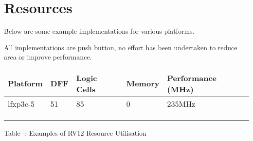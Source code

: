 \section{Resources}\label{resources}

Below are some example implementations for various platforms.

All implementations are push button, no effort has been undertaken to
reduce area or improve performance.

\begin{longtable}[]{@{}lllll@{}}
\toprule
Platform & DFF & Logic Cells & Memory & Performance (MHz)\tabularnewline
\midrule
\endhead
lfxp3c-5 & 51 & 85 & 0 & 235MHz\tabularnewline
& & & &\tabularnewline
& & & &\tabularnewline
& & & &\tabularnewline
\bottomrule
\end{longtable}

Table ‑: Examples of RV12 Resource Utilisation